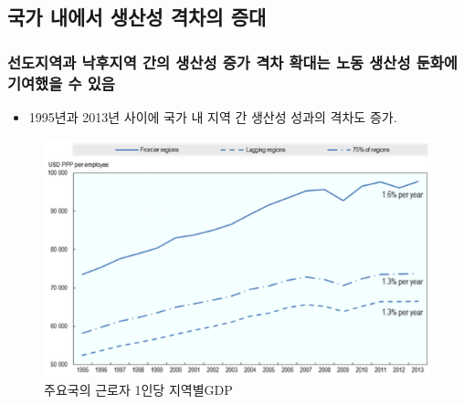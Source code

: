 \documentclass[aspectratio=169,xcolor=dvipsnames,handout]{beamer}
\begin{document}
\subsection{ 국가 내에서 생산성 격차의 증대}

\subsubsection{ 선도지역과 낙후지역 간의 생산성 증가 격차 확대는 노동 생산성 둔화에 기여했을 수 있음}

\begin{frame}{}
    \begin{itemize}
        \item 1995년과 2013년 사이에 국가 내 지역 간 생산성 성과의 격차도 증가.
    \end{itemize}
    \begin{figure}
        \centering
        \includegraphics[scale=.3]{pic/tpin1.11.png}
        \caption{주요국의 근로자 1인당 지역별GDP}
    \end{figure}
\end{frame}
\end{document}
